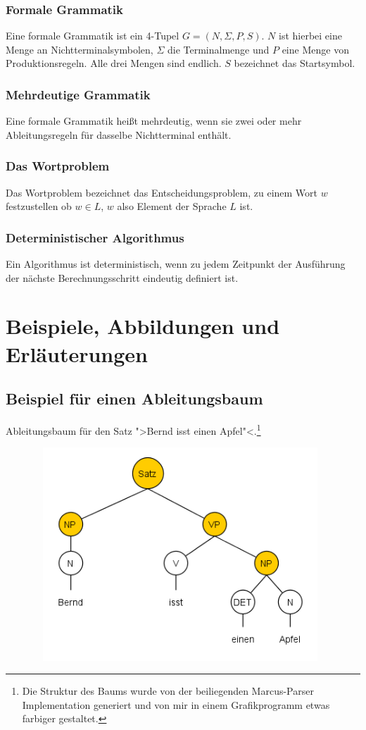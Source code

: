 \documentclass[12pt,a4paper]{article}
\theoremstyle{definition}
\begin{document}
		\subsubsection{Formale Grammatik}
			Eine formale Grammatik ist ein 4-Tupel $G = (N, \Sigma , P, S)$. $N$ ist hierbei eine Menge an Nichtterminalsymbolen, $\Sigma$ die Terminalmenge und $P$ eine Menge von  Produktionsregeln. Alle drei Mengen sind endlich. $S$ bezeichnet das Startsymbol.
		
		\subsubsection{Mehrdeutige Grammatik}
			Eine formale Grammatik heißt mehrdeutig, wenn sie zwei oder mehr Ableitungsregeln für dasselbe Nichtterminal enthält.
	
		\subsubsection{Das Wortproblem}
			Das Wortproblem bezeichnet das Entscheidungsproblem, zu einem Wort $w$ festzustellen ob $w \in L$, $w$ also Element der Sprache $L$ ist.
		
		\subsubsection{Deterministischer Algorithmus}
			Ein Algorithmus ist deterministisch, wenn zu jedem Zeitpunkt der Ausführung der nächste Berechnungsschritt eindeutig definiert ist.

\section{Beispiele, Abbildungen und Erläuterungen}

	\subsection{Beispiel für einen Ableitungsbaum}
		Ableitungsbaum für den Satz ">Bernd isst einen Apfel"<.\footnote{Die Struktur des Baums wurde von der beiliegenden Marcus-Parser Implementation generiert und von mir in einem Grafikprogramm etwas farbiger gestaltet.}

		\begin{figure}[hbtp]
			\centering
			\includegraphics[width=11cm, height=8cm]{Grafiken/Ableitungsbaum}
		\end{figure}
		
\end{document}
